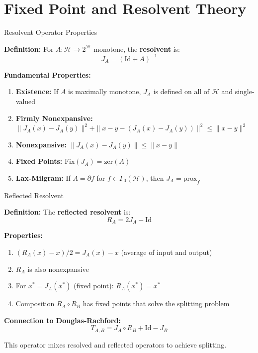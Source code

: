 \documentclass[aspectratio=169,10pt]{beamer}
\begin{document}
\section{Fixed Point and Resolvent Theory}

\begin{frame}{Resolvent Operator Properties}

\textbf{Definition:} For $A: \mathcal{H} \to 2^{\mathcal{H}}$ monotone, the \textbf{resolvent} is:
\[ J_A = (\text{Id} + A)^{-1} \]

\vspace{0.3cm}
\textbf{Fundamental Properties:}

\begin{enumerate}
  \item \textbf{Existence:} If $A$ is maximally monotone, $J_A$ is defined on all of $\mathcal{H}$ and single-valued

  \item \textbf{Firmly Nonexpansive:} $\|J_A(x) - J_A(y)\|^2 + \|x - y - (J_A(x) - J_A(y))\|^2 \leq \|x - y\|^2$

  \item \textbf{Nonexpansive:} $\|J_A(x) - J_A(y)\| \leq \|x - y\|$

  \item \textbf{Fixed Points:} $\text{Fix}(J_A) = \text{zer}(A)$

  \item \textbf{Lax-Milgram:} If $A = \partial f$ for $f \in \Gamma_0(\mathcal{H})$, then $J_A = \text{prox}_f$
\end{enumerate}

\end{frame}

\begin{frame}{Reflected Resolvent}

\textbf{Definition:} The \textbf{reflected resolvent} is:
\[ R_A = 2J_A - \text{Id} \]

\vspace{0.3cm}
\textbf{Properties:}

\begin{enumerate}
  \item $(R_A(x) - x)/2 = J_A(x) - x$ (average of input and output)

  \item $R_A$ is also nonexpansive

  \item For $x^* = J_A(x^*)$ (fixed point): $R_A(x^*) = x^*$

  \item Composition $R_A \circ R_B$ has fixed points that solve the splitting problem
\end{enumerate}

\vspace{0.3cm}
\textbf{Connection to Douglas-Rachford:}
\[ T_{A,B} = J_A \circ R_B + \text{Id} - J_B \]

This operator mixes resolved and reflected operators to achieve splitting.

\end{frame}
\end{document}
